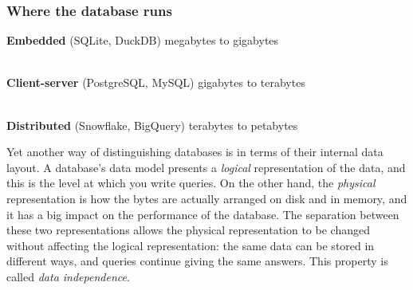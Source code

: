 \begin{frame}
    \label{s:deployment}
    \frametitle{Where the database runs}
    \textbf{Embedded} (SQLite, DuckDB) \hfill megabytes to gigabytes\\[0.2em]
    \\[1em]\pause
    \textbf{Client-server} (PostgreSQL, MySQL) \hfill gigabytes to terabytes\\[0.2em]
    \\[1em]\pause
    \textbf{Distributed} (Snowflake, BigQuery) \hfill terabytes to petabytes\\[0.2em]
\end{frame}
\label{l:deployment}

Yet another way of distinguishing databases is in terms of their internal data layout.
A database's data model presents a \emph{logical} representation of the data, and this is the level at which you write queries.
On the other hand, the \emph{physical} representation is how the bytes are actually arranged on disk and in memory, and it has a big impact on the performance of the database.
The separation between these two representations allows the physical representation to be changed without affecting the logical representation: the same data can be stored in different ways, and queries continue giving the same answers.
This property is called \emph{data independence}.

